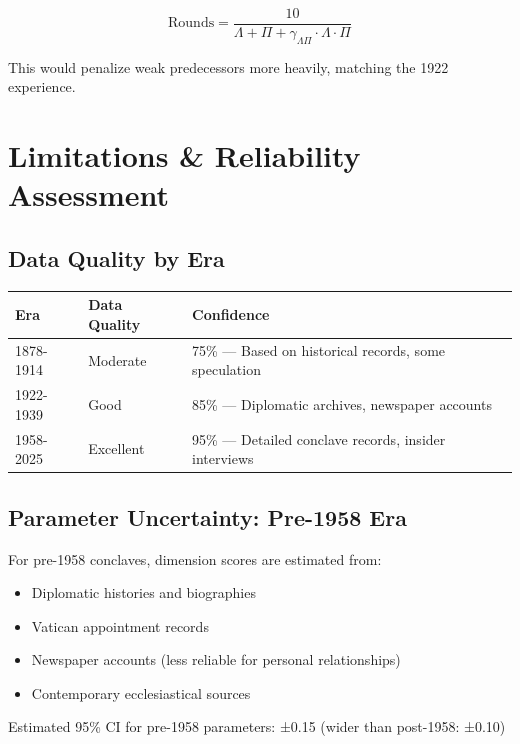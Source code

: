 \begin{equation}
\text{Rounds} = \frac{10}{\Lambda + \Pi + \gamma_{\Lambda\Pi} \cdot \Lambda \cdot \Pi}
\end{equation}

This would penalize weak predecessors more heavily, matching the 1922 experience.


\section{Limitations & Reliability Assessment}

\subsection{Data Quality by Era}

\begin{center}
\begin{tabular}{lll}
\toprule
\textbf{Era} & \textbf{Data Quality} & \textbf{Confidence} \\
\midrule
1878-1914 & Moderate & 75\% --- Based on historical records, some speculation \\
1922-1939 & Good & 85\% --- Diplomatic archives, newspaper accounts \\
1958-2025 & Excellent & 95\% --- Detailed conclave records, insider interviews \\
\bottomrule
\end{tabular}
\end{center}

\subsection{Parameter Uncertainty: Pre-1958 Era}

For pre-1958 conclaves, dimension scores are estimated from:
\begin{itemize}
    \item Diplomatic histories and biographies
    \item Vatican appointment records
    \item Newspaper accounts (less reliable for personal relationships)
    \item Contemporary ecclesiastical sources
\end{itemize}

Estimated 95\% CI for pre-1958 parameters: ±0.15 (wider than post-1958: ±0.10)

